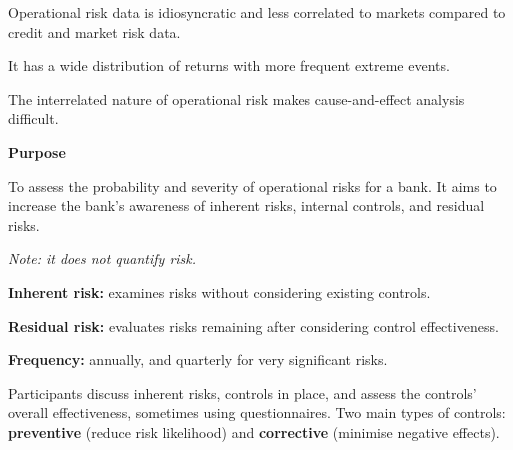 
\begin{lettered}
\item Operational risk data is idiosyncratic and less correlated to markets
compared to credit and market risk data.
\item It has a wide distribution of returns with more frequent extreme events.
\item The interrelated nature of operational risk makes cause-and-effect analysis
difficult.
\end{lettered}



\begin{orkeybox}
{\sffamily\bfseries\fontsize{8.6}{10}\selectfont\color{navy}Purpose}\par
\vspace{2pt}
To assess the probability and severity of operational risks for a bank. It aims
to increase the bank's awareness of inherent risks, internal controls, and
residual risks.\par
\vspace{4pt}
{\fontsize{9}{11}\selectfont\color{rust}\itshape Note: it does not quantify risk.}
\end{orkeybox}

\begin{checks}
\item \textbf{Inherent risk:} examines risks without considering existing
controls.
\item \textbf{Residual risk:} evaluates risks remaining after considering control
effectiveness.
\item \textbf{Frequency:} annually, and quarterly for very significant risks.
\end{checks}


Participants discuss inherent risks, controls in place, and assess the controls'
overall effectiveness, sometimes using questionnaires. Two main types of controls:
\textbf{preventive} (reduce risk likelihood) and \textbf{corrective} (minimise
negative effects).


